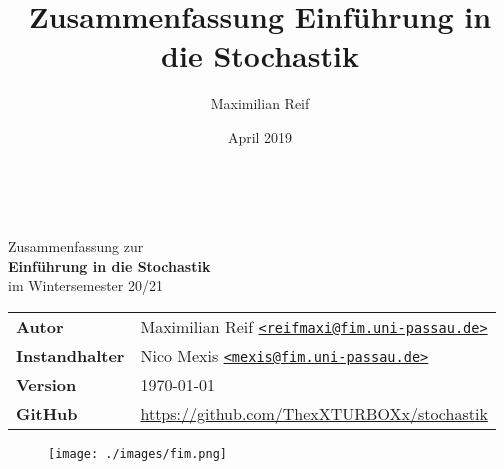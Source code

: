 \documentclass[11pt,a4paper,ngerman]{article}
\date{April 2019}
\author{Maximilian Reif}
\title{Zusammenfassung Einführung in die Stochastik}
\begin{document}
\begin{titlepage}
    \ \newline\newline\newline

  \begin{center}

  \huge Zusammenfassung zur\\
  \Huge\textbf{Einführung in die Stochastik}\\
  \huge im Wintersemester 20/21\\
  \normalsize

  \vspace{1cm}
  \begin{tabular}[b]{l|l}
  \textbf{Autor}         & Maximilian Reif
    \texttt{\href{mailto:reifmaxi@fim.uni-passau.de}{<reifmaxi@fim.uni-passau.de>}} \\
  \textbf{Instandhalter} & Nico Mexis
    \texttt{\href{mailto:mexis@fim.uni-passau.de}{<mexis@fim.uni-passau.de>}} \\
  \textbf{Version}       & \today \\
  \textbf{GitHub}        & \url{https://github.com/ThexXTURBOXx/stochastik}
  \end{tabular}
  \vspace{1cm}

  \end{center}

  \tableofcontents

  \begin{figure}[b]
  \centering
  \texttt{[image: ./images/fim.png]}
  \end{figure}


\end{titlepage}

\setcounter{page}{1}







\end{document}
